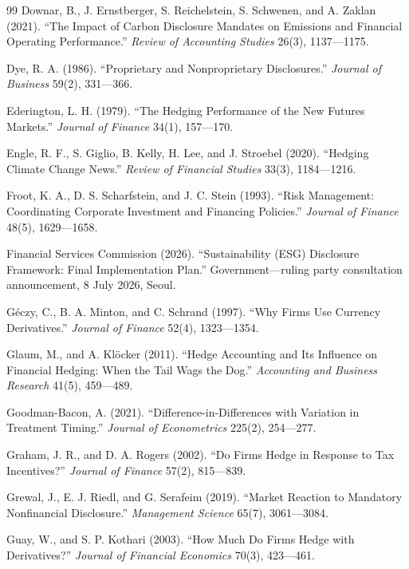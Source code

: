 \documentclass[11pt,a4paper]{article}
\begin{document}
\begin{thebibliography}{99}
 Downar, B., J. Ernstberger, S. Reichelstein, S. Schwenen, and A. Zaklan (2021). ``The Impact of Carbon Disclosure Mandates on Emissions and Financial Operating Performance.'' \emph{Review of Accounting Studies} 26(3), 1137---1175.

 Dye, R. A. (1986). ``Proprietary and Nonproprietary Disclosures.'' \emph{Journal of Business} 59(2), 331---366.

 Ederington, L. H. (1979). ``The Hedging Performance of the New Futures Markets.'' \emph{Journal of Finance} 34(1), 157---170.

 Engle, R. F., S. Giglio, B. Kelly, H. Lee, and J. Stroebel (2020). ``Hedging Climate Change News.'' \emph{Review of Financial Studies} 33(3), 1184---1216.

 Froot, K. A., D. S. Scharfstein, and J. C. Stein (1993). ``Risk Management: Coordinating Corporate Investment and Financing Policies.'' \emph{Journal of Finance} 48(5), 1629---1658.

 Financial Services Commission (2026). ``Sustainability (ESG) Disclosure Framework: Final Implementation Plan.'' Government---ruling party consultation announcement, 8 July 2026, Seoul.

 G\'eczy, C., B. A. Minton, and C. Schrand (1997). ``Why Firms Use Currency Derivatives.'' \emph{Journal of Finance} 52(4), 1323---1354.

 Glaum, M., and A. Kl\"ocker (2011). ``Hedge Accounting and Its Influence on Financial Hedging: When the Tail Wags the Dog.'' \emph{Accounting and Business Research} 41(5), 459---489.

 Goodman-Bacon, A. (2021). ``Difference-in-Differences with Variation in Treatment Timing.'' \emph{Journal of Econometrics} 225(2), 254---277.

 Graham, J. R., and D. A. Rogers (2002). ``Do Firms Hedge in Response to Tax Incentives?'' \emph{Journal of Finance} 57(2), 815---839.

 Grewal, J., E. J. Riedl, and G. Serafeim (2019). ``Market Reaction to Mandatory Nonfinancial Disclosure.'' \emph{Management Science} 65(7), 3061---3084.

 Guay, W., and S. P. Kothari (2003). ``How Much Do Firms Hedge with Derivatives?'' \emph{Journal of Financial Economics} 70(3), 423---461.


\end{thebibliography}
\end{document}
